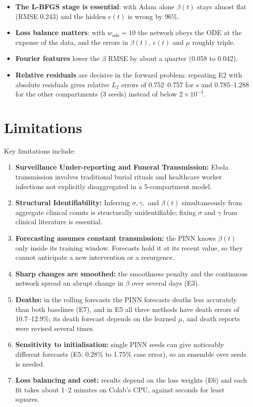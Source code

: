 \documentclass[11pt,a4paper]{article}
\begin{document}
\begin{itemize}
    \item \textbf{The L-BFGS stage is essential}: with Adam alone $\beta(t)$ stays almost flat (RMSE 0.243) and the hidden $e(t)$ is wrong by 96\%.
    \item \textbf{Loss balance matters}: with $w_{\text{ode}} = 10$ the network obeys the ODE at the expense of the data, and the errors in $\beta(t)$, $e(t)$ and $\mu$ roughly triple.
    \item \textbf{Fourier features} lower the $\beta$ RMSE by about a quarter (0.058 to 0.042).
    \item \textbf{Relative residuals} are decisive in the forward problem: repeating E2 with absolute residuals gives relative $L_2$ errors of 0.752--0.757 for $s$ and 0.785--1.288 for the other compartments (3 seeds) instead of below $2\times10^{-3}$.
\end{itemize}

\section{Limitations}
Key limitations include:
\begin{enumerate}
    \item \textbf{Surveillance Under-reporting and Funeral Transmission:} Ebola transmission involves traditional burial rituals and healthcare worker infections not explicitly disaggregated in a 5-compartment model.
    \item \textbf{Structural Identifiability:} Inferring $\sigma, \gamma,$ and $\beta(t)$ simultaneously from aggregate clinical counts is structurally unidentifiable; fixing $\sigma$ and $\gamma$ from clinical literature is essential.
    \item \textbf{Forecasting assumes constant transmission:} the PINN knows $\beta(t)$ only inside its training window. Forecasts hold it at its recent value, so they cannot anticipate a new intervention or a resurgence.
    \item \textbf{Sharp changes are smoothed:} the smoothness penalty and the continuous network spread an abrupt change in $\beta$ over several days (E3).
    \item \textbf{Deaths:} in the rolling forecasts the PINN forecasts deaths less accurately than both baselines (E7), and in E5 all three methods have death errors of 10.7--12.9\%; its death forecast depends on the learned $\mu$, and death reports were revised several times.
    \item \textbf{Sensitivity to initialisation:} single PINN seeds can give noticeably different forecasts (E5: 0.28\% to 1.75\% case error), so an ensemble over seeds is needed.
    \item \textbf{Loss balancing and cost:} results depend on the loss weights (E6) and each fit takes about 1--2 minutes on Colab's CPU, against seconds for least squares.
\end{enumerate}
\end{document}
